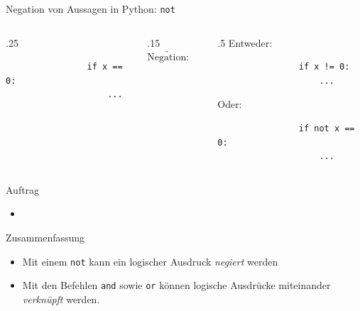 \begin{frame}[fragile]{Negation von Aussagen in Python: \lstinline|not|}
    \begin{columns}
        \begin{column}{.25\textwidth}
            \begin{lstlisting}
                if x == 0:
                    ...
            \end{lstlisting}
        \end{column}
        \begin{column}{.15\textwidth}
            $\underrightarrow{\text{Negation:}}$
        \end{column}
        \begin{column}{.5\textwidth}
            Entweder:
            \begin{lstlisting}
                if x != 0:
                    ...
            \end{lstlisting}
            
            Oder:
            \begin{lstlisting}
                if not x == 0:
                    ...
            \end{lstlisting}
        \end{column}
    \end{columns}
\end{frame}

\begin{frame}[fragile]{Auftrag}
    \begin{itemize}
        \item {}
    \end{itemize}
\end{frame}

\begin{frame}[fragile]{Zusammenfassung}
    \begin{itemize}
        \item Mit einem \lstinline|not| kann ein logischer Ausdruck \textit{negiert} werden
        \item Mit den Befehlen \lstinline|and| sowie \lstinline|or| können logische Ausdrücke miteinander \textit{verknüpft} werden.
    \end{itemize}
\end{frame}